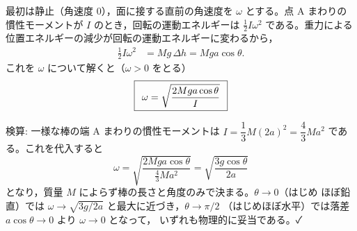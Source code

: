 \documentclass[11pt,a4paper]{article}
\begin{document}
最初は静止（角速度 $0$），面に接する直前の角速度を $\omega$ とする。点 A
まわりの慣性モーメントが $I$ のとき，回転の運動エネルギーは $\frac12 I\omega^2$
である。重力による位置エネルギーの減少が回転の運動エネルギーに変わるから，
\begin{align*}
  \frac{1}{2}I\omega^2 &= Mg\,\Delta h = Mga\cos\theta.
\end{align*}
これを $\omega$ について解くと（$\omega>0$ をとる）
\[
  \boxed{\,\;\omega = \sqrt{\dfrac{2Mga\cos\theta}{I}}\;\,}
\]

\medskip
検算: 一様な棒の端 A まわりの慣性モーメントは
$I=\dfrac{1}{3}M(2a)^2=\dfrac{4}{3}Ma^2$ である。これを代入すると
\[
  \omega=\sqrt{\frac{2Mga\cos\theta}{\frac{4}{3}Ma^2}}
        =\sqrt{\frac{3g\cos\theta}{2a}}
\]
となり，質量 $M$ によらず棒の長さと角度のみで決まる。$\theta\to 0$（はじめ
ほぼ鉛直）では $\omega\to\sqrt{3g/2a}$ と最大に近づき，$\theta\to\pi/2$
（はじめほぼ水平）では落差 $a\cos\theta\to0$ より $\omega\to0$ となって，
いずれも物理的に妥当である。✓
\end{document}
